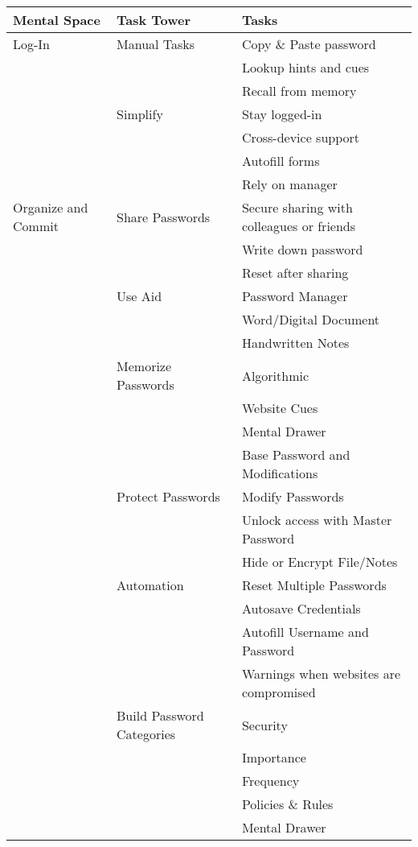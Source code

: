 \begin{table}[htpb]
\def\arraystretch{1.05}%
\begin{threeparttable}
\begin{tabular} {l|l|l}
\textbf{Mental Space} & \textbf{Task Tower} & \textbf{Tasks} \\ \hline\hline 
Log-In 	& Manual Tasks 	& Copy \& Paste password \\
	 	& 		 	& Lookup hints and cues \\ 
	 	& 		 	& Recall from memory \\ 
\cline{2-3}
		& Simplify 	& Stay logged-in \\ 
		& 			& Cross-device support \\ 
		& 			& Autofill forms \\ 
		& 			& Rely on manager \\ \hline
Organize and Commit & Share Passwords & Secure sharing with colleagues or friends \\
		&			& Write down password \\
		&			& Reset after sharing\\ \cline{2-3}
		& Use Aid & Password Manager \\
		& 		 	& Word/Digital Document \\ 
		& 		 	& Handwritten Notes \\  \cline{2-3}
		& Memorize Passwords & Algorithmic \\ 
		&			& Website Cues \\
		& & Mental Drawer \\
		& & Base Password and Modifications \\ \cline{2-3}
		& Protect Passwords & Modify Passwords \\
		& 			& Unlock access with Master Password\\
		&			& Hide or Encrypt File/Notes \\ \cline{2-3}
		& Automation & Reset Multiple Passwords\\
		&  			& Autosave Credentials \\ 
		&			& Autofill Username and Password \\
		&			& Warnings when websites are compromised \\\cline{2-3}
		& Build Password Categories & Security \\ 
		&			& Importance \\
		&			& Frequency \\
		&			& Policies \& Rules \\
		&			& Mental Drawer \\ \hline

\end{tabular}
\end{threeparttable}
\end{table}
